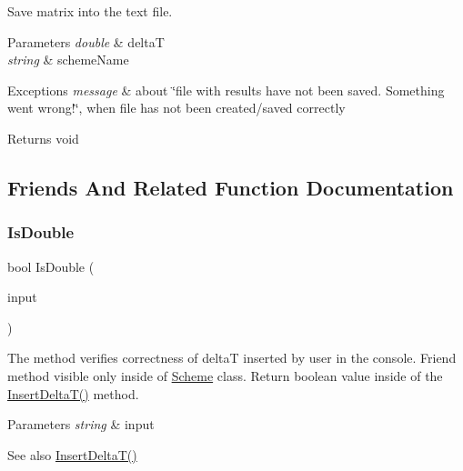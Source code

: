 Save matrix into the text file. 
\begin{DoxyParams}{Parameters}
{\em double} & deltaT \\
\hline
{\em string} & scheme\+Name \\
\hline
\end{DoxyParams}

\begin{DoxyExceptions}{Exceptions}
{\em message} & about \char`\"{}file with results have not been saved. Something went wrong!\char`\"{}, when file has not been created/saved correctly \\
\hline
\end{DoxyExceptions}
\begin{DoxyReturn}{Returns}
void 
\end{DoxyReturn}


\subsection{Friends And Related Function Documentation}
\mbox{\label{class_scheme_ad9aa7a2eac63a3a91e6efc3d8a8093cd}} 
\subsubsection{\texorpdfstring{Is\+Double}{IsDouble}}
{\footnotesize\ttfamily bool Is\+Double (\begin{DoxyParamCaption}\item[{string}]{input }\end{DoxyParamCaption})\hspace{0.3cm}{\ttfamily [friend]}}

The method verifies correctness of deltaT inserted by user in the console. Friend method visible only inside of \mbox{\hyperlink{class_scheme}{Scheme}} class. Return boolean value inside of the \mbox{\hyperlink{class_scheme_ac5803e4951dc125b274f543d5037c21d}{Insert\+Delta\+T()}} method. 
\begin{DoxyParams}{Parameters}
{\em string} & input \\
\hline
\end{DoxyParams}
\begin{DoxySeeAlso}{See also}
\mbox{\hyperlink{class_scheme_ac5803e4951dc125b274f543d5037c21d}{Insert\+Delta\+T()}} 
\end{DoxySeeAlso}


